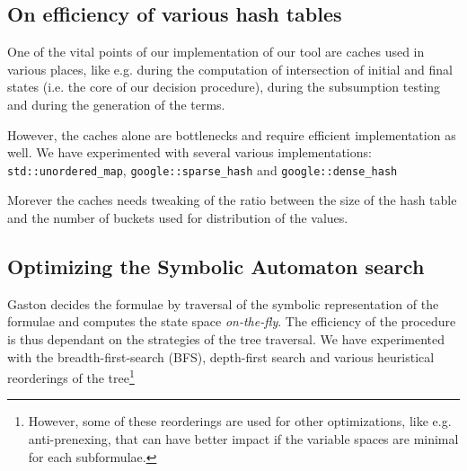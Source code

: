  \subsection{On efficiency of various hash tables}
  
  One of the vital points of our implementation of our tool
  are caches used in various places, like e.g. during the
  computation of intersection of initial and final states 
  (i.e. the core of our decision procedure), during the
  subsumption testing and during the generation of the terms.
  
  However, the caches alone are bottlenecks and require efficient
  implementation as well. We have experimented with several 
  various implementations: \texttt{std::unordered\_map},
  \texttt{google::sparse\_hash} and \texttt{google::dense\_hash}
  
  Morever the caches needs tweaking of the ratio between the
  size of the hash table and the number of buckets used for
  distribution of the values.

  \subsection{Optimizing the Symbolic Automaton search}
  
  Gaston decides the formulae by traversal of the symbolic
  representation of the formulae and computes the state space
  \emph{on-the-fly}. The efficiency of the procedure is thus
  dependant on the strategies of the tree traversal. We have
  experimented with the breadth-first-search (BFS), depth-first
  search and various heuristical reorderings of the tree\footnote{However,
  some of these reorderings are used for other optimizations, like
  e.g. anti-prenexing, that can have better impact if the
  variable spaces are minimal for each subformulae.}

